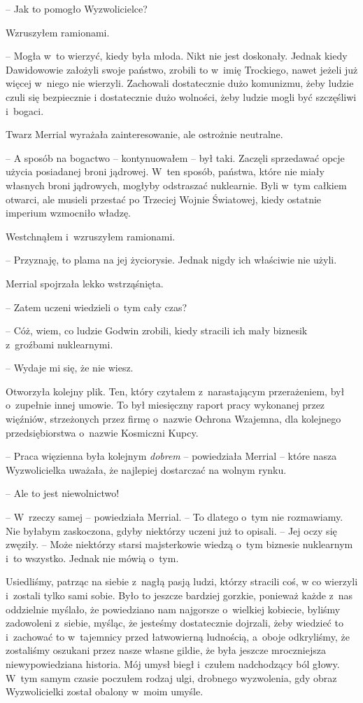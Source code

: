 \documentclass[oneside,polish,11pt,sfheadings]{mwbk}
\begin{document}
-- Jak to pomogło Wyzwolicielce?

Wzruszyłem ramionami. 

-- Mogła w~to wierzyć, kiedy była młoda. Nikt nie
jest doskonały. Jednak kiedy Dawidowowie założyli swoje państwo, zrobili
to w~imię Trockiego, nawet jeżeli już więcej w~niego nie wierzyli.
Zachowali dostatecznie dużo komunizmu, żeby ludzie czuli się bezpiecznie
i dostatecznie dużo wolności, żeby ludzie mogli być szczęśliwi i~bogaci.

Twarz Merrial wyrażała zainteresowanie, ale ostrożnie neutralne.

-- A sposób na bogactwo -- kontynuowałem -- był taki. Zaczęli sprzedawać
opcje użycia posiadanej broni jądrowej. W~ten sposób, państwa, które nie
miały własnych broni jądrowych, mogłyby odstraszać nuklearnie. Byli w~tym całkiem otwarci, ale musieli przestać po Trzeciej Wojnie Światowej,
kiedy ostatnie imperium wzmocniło władzę.

Westchnąłem i~wzruszyłem ramionami. 

-- Przyznaję, to plama na jej
życiorysie. Jednak nigdy ich właściwie nie użyli.

Merrial spojrzała lekko wstrząśnięta. 

-- Zatem uczeni wiedzieli o~tym
cały czas? 

-- Cóż, wiem, co ludzie Godwin zrobili, kiedy stracili ich mały
biznesik z~groźbami nuklearnymi. 

-- Wydaje mi się, że nie wiesz.

Otworzyła kolejny plik. Ten, który czytałem z~narastającym przerażeniem,
był o~zupełnie innej umowie. To był miesięczny raport pracy wykonanej
przez więźniów, strzeżonych przez firmę o~nazwie Ochrona Wzajemna, dla
kolejnego przedsiębiorstwa o~nazwie Kosmiczni Kupcy.

-- Praca więzienna była kolejnym \textit{dobrem} -- powiedziała Merrial -- które nasza Wyzwolicielka uważała, że najlepiej dostarczać na wolnym
rynku.

-- Ale to jest niewolnictwo!

-- W~rzeczy samej -- powiedziała Merrial. -- To dlatego o~tym nie
rozmawiamy. Nie byłabym zaskoczona, gdyby niektórzy uczeni już to
opisali. -- Jej oczy się zwęziły. -- Może niektórzy starsi majsterkowie
wiedzą o~tym biznesie nuklearnym i~to wszystko. Jednak nie mówią o~tym.

Usiedliśmy, patrząc na siebie z~nagłą pasją ludzi, którzy stracili coś,
w co wierzyli i~zostali tylko sami sobie. Było to jeszcze bardziej
gorzkie, ponieważ każde z~nas oddzielnie myślało, że powiedziano nam
najgorsze o~wielkiej kobiecie, byliśmy zadowoleni z~siebie, myśląc, że
jesteśmy dostatecznie dojrzali, żeby wiedzieć to i~zachować to w~tajemnicy przed łatwowierną ludnością, a~oboje odkryliśmy, że zostaliśmy
oszukani przez nasze własne gildie, że była jeszcze mroczniejsza
niewypowiedziana historia. Mój umysł biegł i~czułem nadchodzący ból
głowy. W~tym samym czasie poczułem rodzaj ulgi, drobnego wyzwolenia, gdy
obraz Wyzwolicielki został obalony w~moim umyśle.
\end{document}
